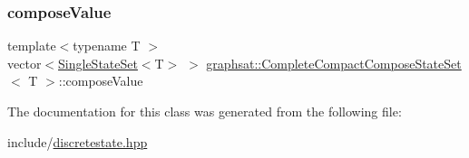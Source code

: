 \subsubsection{\texorpdfstring{composeValue}{composeValue}}
{\footnotesize\ttfamily template$<$typename T $>$ \\
vector$<$\mbox{\hyperlink{classgraphsat_1_1_single_state_set}{Single\+State\+Set}}$<$T$>$ $>$ \mbox{\hyperlink{classgraphsat_1_1_complete_compact_compose_state_set}{graphsat\+::\+Complete\+Compact\+Compose\+State\+Set}}$<$ T $>$\+::compose\+Value\hspace{0.3cm}{\ttfamily [private]}}



The documentation for this class was generated from the following file\+:\begin{DoxyCompactItemize}
\item 
include/\mbox{\hyperlink{discretestate_8hpp}{discretestate.\+hpp}}\end{DoxyCompactItemize}
